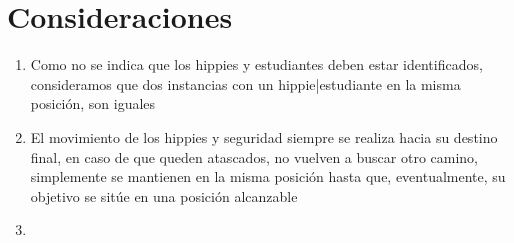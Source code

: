 \documentclass[10pt, a4paper]{article}
\begin{document}
\newpage
\section{Consideraciones}
\begin{enumerate}
  \item Como no se indica que los hippies y estudiantes deben estar identificados, consideramos que dos instancias con un 
		hippie|estudiante en la misma posición, son iguales
  \item El movimiento de los hippies y seguridad siempre se realiza hacia su destino final, en caso de que queden atascados, no vuelven a buscar 
		otro camino, simplemente se mantienen en la misma posición hasta que, eventualmente, su objetivo se sitúe en una posición alcanzable
  \item 
\end{enumerate}
\end{document}
